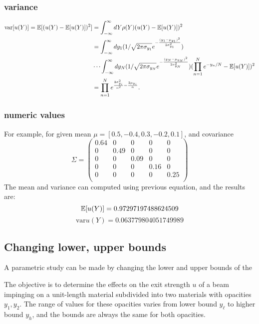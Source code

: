 \subsubsection{variance}
\begin{align}
\text{var}[u(Y)]=\mathbb{E}[ (u(Y)-\mathbb{E}[ u(Y)])^2] &= \int_{-\infty}^\infty dY \rho(Y)(u(Y)-\mathbb{E}[ u(Y)])^2 \notag \\
  &=\int_{-\infty}^\infty dy_1 (1/\sqrt{2 \pi \sigma_{y_1}}e^{-\frac{(y_1-\mu_{y_1})^2}{2\sigma_{y_1}^2}})\\
  &\cdots\int_{-\infty}^\infty dy_N  (1/\sqrt{2 \pi \sigma_{y_N}}e^{-\frac{(y_N-\mu_{y_N})^2}{2\sigma_{y_N}^2}})(\prod_{n=1}^N e^{-y_n/N}-\mathbb{E}[ u(Y)])^2 \notag\\
  &=\prod_{n=1}^N e^{\frac{2 \sigma_{y_i}^2}{n^2}-\frac{2\mu_{y_i}}{n}}. \notag
\end{align}
\subsubsection{numeric values}
For example, for given mean $\mu = [0.5, -0.4, 0.3, -0.2, 0.1]$, and covariance
\begin{equation}
\Sigma =
\begin{pmatrix}
0.64 & 0 & 0 & 0 & 0 \\
0 & 0.49 & 0 & 0 & 0 \\
0 & 0 & 0.09 & 0 & 0 \\
0 & 0 & 0 & 0.16 & 0 \\
0 & 0 & 0 & 0 & 0.25 \\
\end{pmatrix}
\end{equation}
The mean and variance can computed using previous equation, and the results are:
\begin{equation}
\mathbb{E}[ u(Y)] = 0.97297197488624509
\end{equation}
\begin{equation}
\text{var}{u(Y)} = 0.063779804051749989
\end{equation}

\subsection{Changing lower, upper bounds}
A parametric study can be made by changing the lower and upper bounds of the

The objective is to determine the effects on the exit strength $u$ of a beam impinging on a
unit-length material subdivided into two materials with opacities $y_1, y_2$.  The range of values for
these opacities varies from lower bound $y_\ell$ to higher bound $y_h$, and the bounds are always
the same for both opacities.

